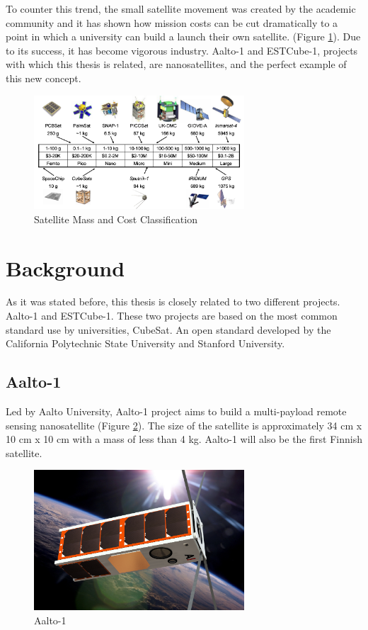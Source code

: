 To counter this trend, the small satellite movement was created by the academic community and it has shown how mission costs can be cut dramatically to a point in which a university can build a launch their own satellite. (Figure \ref{f1.3}). Due to its success, it has become vigorous industry. Aalto-1 and ESTCube-1, projects with which this thesis is related, are nanosatellites, and the perfect example of this new concept.\\

\begin{figure}[H]
\centerline{\includegraphics[width=0.7\textwidth]{images/satclass.png}}
\caption{Satellite Mass and Cost Classification \cite{BARN}}
\label{f1.3}
\end{figure}

\section{Background}\label{1.1}

As it was stated before, this thesis is closely related to two different projects. Aalto-1 and ESTCube-1. These two projects are based on the most common standard use by universities, CubeSat\cite{CubeSat}. An open standard developed by the California Polytechnic State University and Stanford University.

\subsection{Aalto-1}

Led by Aalto University, Aalto-1 project aims to build a multi-payload remote sensing nanosatellite (Figure \ref{f1.4}). The size of the satellite is approximately 34 cm x 10 cm x 10 cm with a mass of less than 4 kg\cite{AALTO1a}. Aalto-1 will also be the first Finnish satellite.

\begin{figure}[H]
\centerline{\includegraphics[width=0.7\textwidth]{images/aalto1.png}}
\caption{Aalto-1}
\label{f1.4}
\end{figure}


